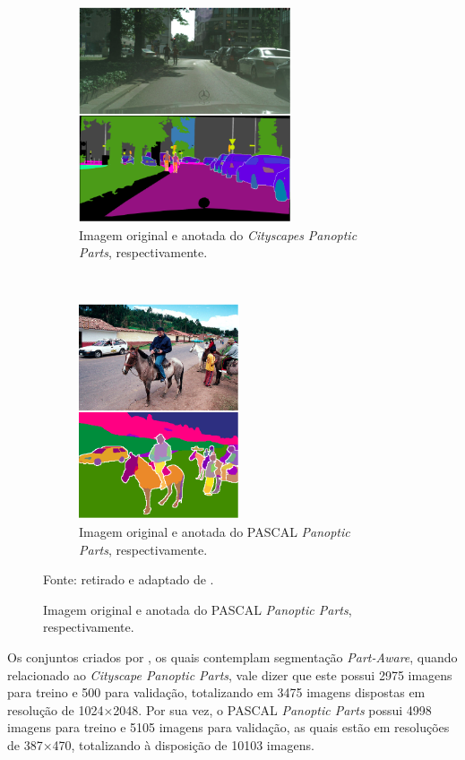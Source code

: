 \begin{figure}[H]
   \caption{Imagens originais e anotadas dos \textit{datasets} para \textit{Part-Aware Panoptic Segmentation}.}
   \centering
   \label{proposal:dataset:fig:1}
    \begin{subfigure}[t]{0.45\textwidth}
        \centering
        \includegraphics[height=2.5in]{recursos/imagens/proposal/city.png}
        \caption{Imagem original e anotada do \textit{Cityscapes Panoptic Parts}, respectivamente.}
        \label{proposal:dataset:fig:1.1}
    \end{subfigure}%
    ~ 
    \begin{subfigure}[t]{0.45\textwidth}
        \centering
        \includegraphics[height=2.5in]{recursos/imagens/proposal/pascal.png}
        \caption{Imagem original e anotada do PASCAL \textit{Panoptic Parts}, respectivamente.}
        \label{proposal:dataset:fig:1.2}
    \end{subfigure}%

    Fonte: retirado e adaptado de \cite{Lin2016}.
\end{figure}


Os conjuntos criados por \cite{DeGeus2021}, os quais contemplam segmentação \textit{Part-Aware}, quando relacionado ao \textit{Cityscape Panoptic Parts}, vale dizer que este possui 2975 imagens para treino e 500 para validação, totalizando em 3475 imagens dispostas em resolução de 1024×2048. Por sua vez, o PASCAL \textit{Panoptic Parts} possui 4998 imagens para treino e  5105 imagens para validação, as quais estão em resoluções de 387×470, totalizando à disposição de 10103 imagens.

